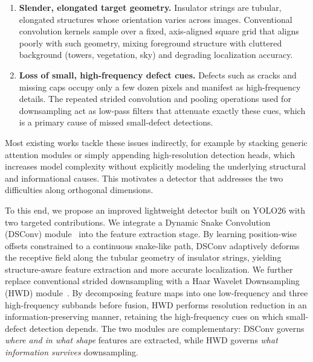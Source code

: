 \documentclass[sensors,article,submit,pdftex,moreauthors]{Definitions/mdpi}
\begin{document}
\begin{enumerate}
\item \textbf{Slender, elongated target geometry.} Insulator strings are tubular, elongated structures whose orientation varies across images. Conventional convolution kernels sample over a fixed, axis-aligned square grid that aligns poorly with such geometry, mixing foreground structure with cluttered background (towers, vegetation, sky) and degrading localization accuracy.
\item \textbf{Loss of small, high-frequency defect cues.} Defects such as cracks and missing caps occupy only a few dozen pixels and manifest as high-frequency details. The repeated strided convolution and pooling operations used for downsampling act as low-pass filters that attenuate exactly these cues, which is a primary cause of missed small-defect detections.
\end{enumerate}

Most existing works tackle these issues indirectly, for example by stacking generic attention modules or simply appending high-resolution detection heads, which increases model complexity without explicitly modeling the underlying structural and informational causes. This motivates a detector that addresses the two difficulties along orthogonal dimensions.

To this end, we propose an improved lightweight detector built on YOLO26 with two targeted contributions. We integrate a Dynamic Snake Convolution (DSConv) module~\cite{qi2023dynamic} into the feature extraction stage. By learning position-wise offsets constrained to a continuous snake-like path, DSConv adaptively deforms the receptive field along the tubular geometry of insulator strings, yielding structure-aware feature extraction and more accurate localization. We further replace conventional strided downsampling with a Haar Wavelet Downsampling (HWD) module~\cite{xu2023haar}. By decomposing feature maps into one low-frequency and three high-frequency subbands before fusion, HWD performs resolution reduction in an information-preserving manner, retaining the high-frequency cues on which small-defect detection depends. The two modules are complementary: DSConv governs \emph{where and in what shape} features are extracted, while HWD governs \emph{what information survives} downsampling.
\end{document}
